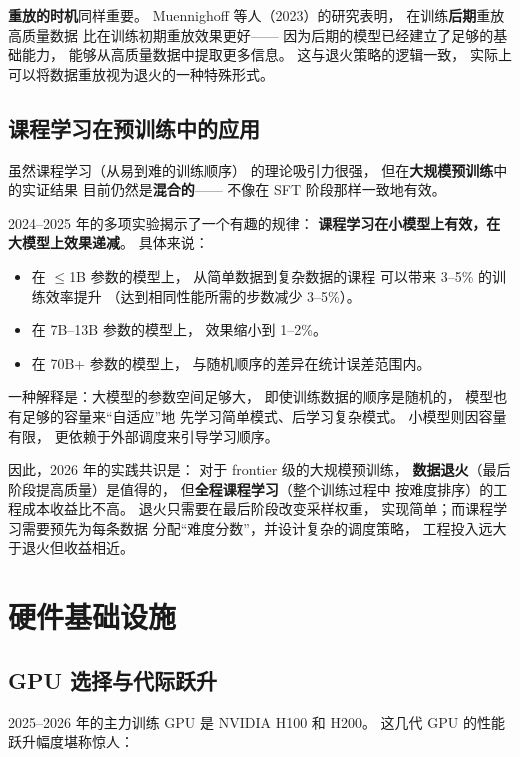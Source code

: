 \textbf{重放的时机}同样重要。
Muennighoff 等人（2023）的研究表明，
在训练\textbf{后期}重放高质量数据
比在训练初期重放效果更好——
因为后期的模型已经建立了足够的基础能力，
能够从高质量数据中提取更多信息。
这与退火策略的逻辑一致，
实际上可以将数据重放视为退火的一种特殊形式。

\subsection{课程学习在预训练中的应用}

虽然课程学习（从易到难的训练顺序）
的理论吸引力很强，
但在\textbf{大规模预训练}中的实证结果
目前仍然是\textbf{混合的}——
不像在 SFT 阶段那样一致地有效。

2024--2025 年的多项实验揭示了一个有趣的规律：
\textbf{课程学习在小模型上有效，在大模型上效果递减}。
具体来说：
\begin{itemize}[noitemsep]
  \item 在 $\leq$1B 参数的模型上，
        从简单数据到复杂数据的课程
        可以带来 3--5\% 的训练效率提升
        （达到相同性能所需的步数减少 3--5\%）。
  \item 在 7B--13B 参数的模型上，
        效果缩小到 1--2\%。
  \item 在 70B+ 参数的模型上，
        与随机顺序的差异在统计误差范围内。
\end{itemize}

一种解释是：大模型的参数空间足够大，
即使训练数据的顺序是随机的，
模型也有足够的容量来``自适应''地
先学习简单模式、后学习复杂模式。
小模型则因容量有限，
更依赖于外部调度来引导学习顺序。

因此，2026 年的实践共识是：
对于 frontier 级的大规模预训练，
\textbf{数据退火}（最后阶段提高质量）是值得的，
但\textbf{全程课程学习}（整个训练过程中
按难度排序）的工程成本收益比不高。
退火只需要在最后阶段改变采样权重，
实现简单；而课程学习需要预先为每条数据
分配``难度分数''，并设计复杂的调度策略，
工程投入远大于退火但收益相近。

\section{硬件基础设施}

\subsection{GPU 选择与代际跃升}

2025--2026 年的主力训练 GPU 是 NVIDIA H100 和 H200。
这几代 GPU 的性能跃升幅度堪称惊人：

